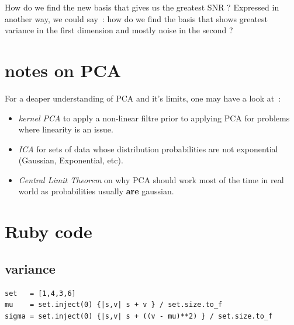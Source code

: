 \documentclass[11pt,twocolumn]{amsart} %
\begin{document}
How do we find the new basis that gives us the greatest SNR ? Expressed in another way, we could say~: how do we find the basis that shows greatest variance in the first dimension and mostly noise in the second ?

\section{notes on PCA}

For a deaper understanding of PCA and it's limits, one may have a look at~:
\begin{itemize}
  \item \emph{kernel PCA} to apply a non-linear filtre prior to applying PCA for problems where linearity is an issue.
  \item \emph{ICA} for sets of data whose distribution probabilities are not exponential (Gaussian, Exponential, etc).
  \item \emph{Central Limit Theorem} on why PCA should work most of the time in real world as probabilities usually \textbf{are} gaussian.
\end{itemize}

\onecolumn

\section{Ruby code}
\subsection{variance}
\begin{verbatim}
set   = [1,4,3,6]
mu    = set.inject(0) {|s,v| s + v } / set.size.to_f
sigma = set.inject(0) {|s,v| s + ((v - mu)**2) } / set.size.to_f
\end{verbatim}
\end{document}
